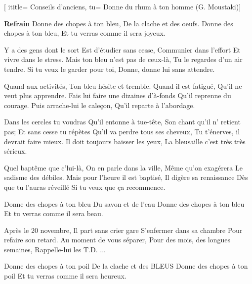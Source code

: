  [
ititle= {Conseils d'anciens},
tu= {Donne du rhum à ton homme (G. Moustaki)}]


\beginchorus
\textbf {Refrain}
Donne des chopes à ton bleu,
De la clache et des oeufs.
Donne des chopes à ton bleu,
Et tu verras comme il sera joyeux.
\endchorus

\beginverse
Y a des gens dont le sort
Est d'étudier sans cesse,
Communier dans l'effort
Et vivre dans le stress.
Mais ton bleu n'est pas de ceux-là,
Tu le regardes d'un air tendre.
Si tu veux le garder pour toi,
Donne, donne lui sans attendre.
\endverse

\beginverse
Quand aux activités,
Ton bleu hésite et tremble.
Quand il est fatigué,
Qu'il ne veut plus apprendre.
Fais lui faire une dizaines d'à-fonds
Qu'il reprenne du courage.
Puis arrache-lui le caleçon,
Qu'il reparte à l'abordage.
\endverse

\beginverse
Dans les cercles tu voudras
Qu'il entonne à tue-tête,
Son chant qu'il n' retient pas;
Et sans cesse tu répètes
Qu'il va perdre tous ses cheveux,
Tu t'énerves, il devrait faire mieux.
Il doit toujours baisser les yeux,
La bleusaille c'est très très sérieux.
\endverse

\beginverse
Quel baptême que c'lui-là,
On en parle dans la ville,
Même qu'on exagérera
Le sadisme des débiles.
Mais pour l'heure il est baptisé,
Il digère sa renaissance
Dès que tu l'auras réveillé
Si tu veux que ça recommence.
\endverse

\beginchorus
Donne des chopes à ton bleu
Du savon et de l'eau
Donne des chopes à ton bleu
Et tu verras comme il sera beau.
\endchorus

\beginverse
Après le 20 novembre,
Il part sans crier gare
S'enfermer dans sa chambre
Pour refaire son retard.
Au moment de vous séparer,
Pour des mois, des longues semaines,
Rappelle-lui les T.D. ...
\endverse

\beginchorus
Donne des chopes à ton poil
De la clache et des BLEUS
Donne des chopes à ton poil
Et tu verras comme il sera heureux.
\endchorus

\endsong